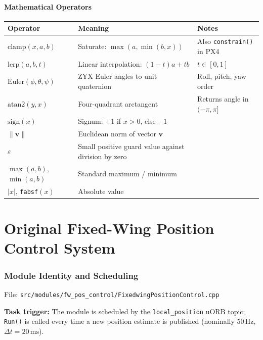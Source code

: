 \documentclass[12pt,a4paper]{article}
\begin{document}
\subsection*{Mathematical Operators}
\begin{center}\begin{tabular}{lll}\toprule
Operator & Meaning & Notes \\\midrule
$\text{clamp}(x,a,b)$ & Saturate: $\max(a,\min(b,x))$ & Also \texttt{constrain()} in PX4 \\
$\text{lerp}(a,b,t)$ & Linear interpolation: $(1-t)a+tb$ & $t\in[0,1]$ \\
$\text{Euler}(\phi,\theta,\psi)$ & ZYX Euler angles to unit quaternion & Roll, pitch, yaw order \\
$\text{atan2}(y,x)$ & Four-quadrant arctangent & Returns angle in $(-\pi,\pi]$ \\
$\text{sign}(x)$ & Signum: $+1$ if $x>0$, else $-1$ & \\
$\|\mathbf{v}\|$ & Euclidean norm of vector $\mathbf{v}$ & \\
$\varepsilon$ & Small positive guard value against division by zero & \\
$\max(a,b)$, $\min(a,b)$ & Standard maximum / minimum & \\
$|x|$, \texttt{fabsf}$(x)$ & Absolute value & \\
\bottomrule\end{tabular}\end{center}

\newpage
\part{Original Fixed-Wing Position Control System}

\section{Module Identity and Scheduling}

File: \texttt{src/modules/fw\_pos\_control/FixedwingPositionControl.cpp}

\textbf{Task trigger:} The module is scheduled by the
\texttt{local\_position} uORB topic; \texttt{Run()} is called
every time a new position estimate is published (nominally 50\,Hz,
$\Delta t = 20\,\text{ms}$).
\end{document}
